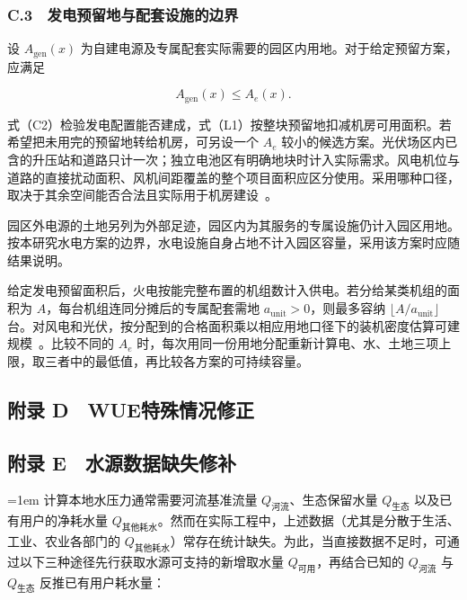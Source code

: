 \subsubsection{C.3　发电预留地与配套设施的边界}

设 $A_{\mathrm{gen}}(x)$ 为自建电源及专属配套实际需要的园区内用地。对于给定预留方案，应满足

\begin{equation}
A_{\mathrm{gen}}(x)\le A_e(x).
\tag{C2}
\end{equation}

式（C2）检验发电配置能否建成，式（L1）按整块预留地扣减机房可用面积。若希望把未用完的预留地转给机房，可另设一个 $A_e$ 较小的候选方案。光伏场区内已含的升压站和道路只计一次；独立电池区有明确地块时计入实际需求。风电机位与道路的直接扰动面积、风机间距覆盖的整个项目面积应区分使用。采用哪种口径，取决于其余空间能否合法且实际用于机房建设~\cite{apxrefL03,apxrefL04,apxrefL05}。

园区外电源的土地另列为外部足迹，园区内为其服务的专属设施仍计入园区用地。按本研究水电方案的边界，水电设施自身占地不计入园区容量，采用该方案时应随结果说明。

给定发电预留面积后，火电按能完整布置的机组数计入供电。若分给某类机组的面积为 $A$，每台机组连同分摊后的专属配套需地 $a_{\mathrm{unit}}>0$，则最多容纳 $\lfloor A/a_{\mathrm{unit}}\rfloor$ 台。对风电和光伏，按分配到的合格面积乘以相应用地口径下的装机密度估算可建规模~\cite{apxrefL04,apxrefL05}。比较不同的 $A_e$ 时，每次用同一份用地分配重新计算电、水、土地三项上限，取三者中的最低值，再比较各方案的可持续容量。

\subsection{附录 D　WUE特殊情况修正}

\subsection{附录 E　水源数据缺失修补}

{\emergencystretch=1em
计算本地水压力通常需要河流基准流量 $Q_{\text{河流}}$、生态保留水量 $Q_{\text{生态}}$ 以及已有用户的净耗水量 $Q_{\text{其他耗水}}$。然而在实际工程中，上述数据（尤其是分散于生活、工业、农业各部门的 $Q_{\text{其他耗水}}$）常存在统计缺失。为此，当直接数据不足时，可通过以下三种途径先行获取水源可支持的新增取水量 $Q_{\text{可用}}$，再结合已知的 $Q_{\text{河流}}$ 与 $Q_{\text{生态}}$ 反推已有用户耗水量：\par}

